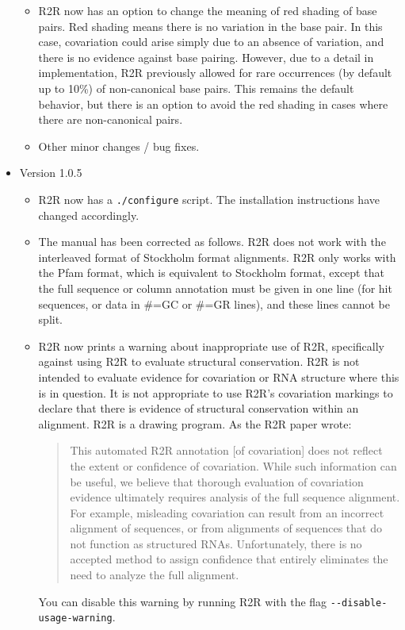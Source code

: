 \documentclass[letterpaper,12pt]{report}
\begin{document}
\begin{itemize}
\begin{itemize}
  \item R2R now has an option to change the meaning of red shading of base pairs.  Red shading means there is no variation in the base pair.  In this case, covariation could arise simply due to an absence of variation, and there is no evidence against base pairing.  However, due to a detail in implementation, R2R previously allowed for rare occurrences (by default up to 10\%) of non-canonical base pairs.  This remains the default behavior, but there is an option to avoid the red shading in cases where there are non-canonical pairs.
  \item Other minor changes / bug fixes.
  \end{itemize}
\item Version 1.0.5
  \begin{itemize}
    \item R2R now has a {\tt ./configure} script.  The installation instructions have changed accordingly.
    \item The manual has been corrected as follows.  R2R does not work with the interleaved format of Stockholm format alignments.  R2R only works with the Pfam format, which is equivalent to Stockholm format, except that the full sequence or column annotation must be given in one line (for hit sequences, or data in \#=GC or \#=GR lines), and these lines cannot be split.
    \item R2R now prints a warning about inappropriate use of R2R, specifically against using R2R to evaluate structural conservation.  R2R is not intended to evaluate evidence for covariation or RNA structure where this is in question. It is not appropriate to use R2R's covariation markings to declare that there is evidence of structural conservation within an alignment.  R2R is a drawing program.  As the R2R paper wrote\cite{RtoR}:
\begin{quote}This automated R2R annotation [of covariation] does not reflect the extent or confidence of covariation. While such information can be useful, we believe that thorough evaluation of covariation evidence ultimately requires analysis of the full sequence alignment. For example, misleading covariation can result from an incorrect alignment of sequences, or from alignments of sequences that do not function as structured RNAs. Unfortunately, there is no accepted method to assign confidence that entirely eliminates the need to analyze the full alignment.
\end{quote}
You can disable this warning by running R2R with the flag {\tt -{}-disable-usage-warning}.

\end{itemize}
\end{itemize}
\end{document}
